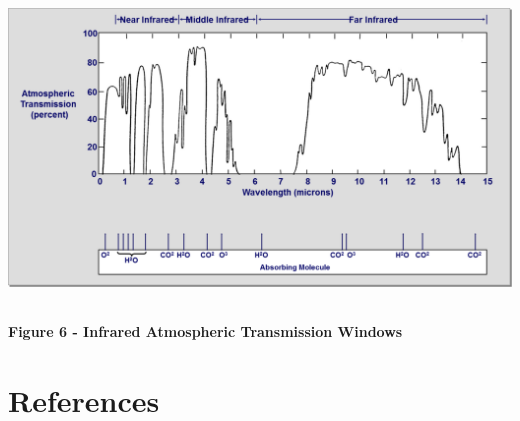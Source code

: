 \documentclass[
]{book}
\begin{document}
\includegraphics[width=5.86458in,height=3.2563in]{media/19/image7.png}

\textbf{Figure 6 - Infrared Atmospheric Transmission Windows}

\hypertarget{references-14}{%
\section{References}\label{references-14}}
\end{document}
